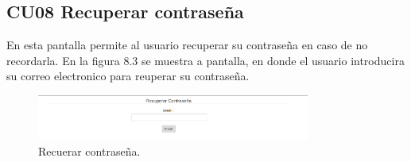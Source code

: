 \subsection{CU08 Recuperar contraseña}
{
\justify
{}
}
\justify
En esta pantalla permite al usuario recuperar su contraseña en caso de no recordarla.
{
\justify
{}
}
\justify
En la figura 8.3 se muestra a pantalla, en donde el usuario introducira su correo electronico para reuperar su contraseña.

\begin{figure}[htb]
\centering
\includegraphics[width=0.8\textwidth]{./images/cu03-recuperar-contrasena.png}
\caption{Recuerar contraseña.} \label{fig:horizonte}
\end{figure}